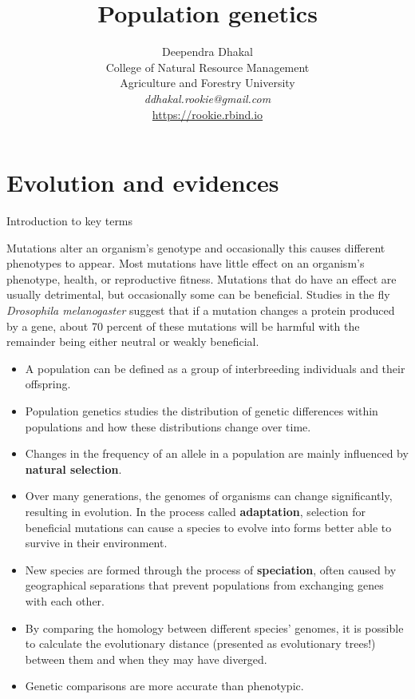 \documentclass[11pt,dvipsnames,ignorenonframetext,aspectratio=169]{beamer}
\title[]{Population genetics}
\author[
        Deependra Dhakal\\
College of Natural Resource Management\\
Agriculture and Forestry University\\
\textit{ddhakal.rookie@gmail.com}\\
\url{https://rookie.rbind.io}
    ]{Deependra Dhakal\\
College of Natural Resource Management\\
Agriculture and Forestry University\\
\textit{ddhakal.rookie@gmail.com}\\
\url{https://rookie.rbind.io}}
\date[
      
  ]{
    }
\providecommand{\tightlist}{%
  \setlength{\itemsep}{0pt}\setlength{\parskip}{0pt}}
\begin{document}
  \begin{frame}[plain]
  \titlepage
  \end{frame}



\hypertarget{evolution-and-evidences}{%
\section{Evolution and evidences}\label{evolution-and-evidences}}

\begin{frame}{Introduction to key terms}
\protect\hypertarget{introduction-to-key-terms}{}
\footnotesize

Mutations alter an organism's genotype and occasionally this causes
different phenotypes to appear. Most mutations have little effect on an
organism's phenotype, health, or reproductive fitness. Mutations that do
have an effect are usually detrimental, but occasionally some can be
beneficial. Studies in the fly \emph{Drosophila melanogaster} suggest
that if a mutation changes a protein produced by a gene, about 70
percent of these mutations will be harmful with the remainder being
either neutral or weakly beneficial.

\begin{itemize}
\tightlist
\item
  A population can be defined as a group of interbreeding individuals
  and their offspring.
\item
  Population genetics studies the distribution of genetic differences
  within populations and how these distributions change over time.
\item
  Changes in the frequency of an allele in a population are mainly
  influenced by \textbf{natural selection}.
\item
  Over many generations, the genomes of organisms can change
  significantly, resulting in evolution. In the process called
  \textbf{adaptation}, selection for beneficial mutations can cause a
  species to evolve into forms better able to survive in their
  environment.
\item
  New species are formed through the process of \textbf{speciation},
  often caused by geographical separations that prevent populations from
  exchanging genes with each other.
\item
  By comparing the homology between different species' genomes, it is
  possible to calculate the evolutionary distance (presented as
  evolutionary trees!) between them and when they may have diverged.
\item
  Genetic comparisons are more accurate than phenotypic.
\end{itemize}
\end{frame}
\end{document}
